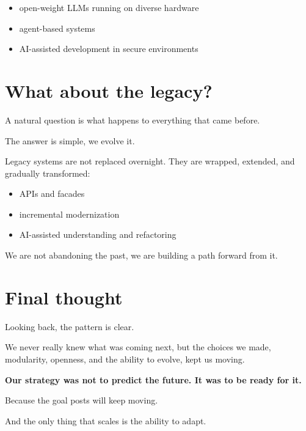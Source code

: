 \documentclass[11pt]{article}
\begin{document}
\begin{itemize}
\item open-weight LLMs running on diverse hardware
\item agent-based systems
\item AI-assisted development in secure environments
\end{itemize}

\newpage

\section*{What about the legacy?}

A natural question is what happens to everything that came before.

The answer is simple, we evolve it.

Legacy systems are not replaced overnight. They are wrapped, extended, and gradually transformed:

\begin{itemize}
\item APIs and facades
\item incremental modernization
\item AI-assisted understanding and refactoring
\end{itemize}

We are not abandoning the past, we are building a path forward from it.

\section*{Final thought}

Looking back, the pattern is clear.

We never really knew what was coming next, but the choices we made, modularity, openness, and the ability to evolve, kept us moving.

\textbf{Our strategy was not to predict the future. It was to be ready for it.}

Because the goal posts will keep moving.

And the only thing that scales is the ability to adapt.
\end{document}
